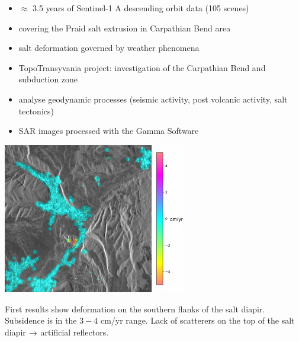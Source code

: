 \documentclass{beamer}
\begin{document}
\begin{frame}{\ft}
    \begin{itemize}
        \item $\approx$ 3.5 years of Sentinel-1 A descending orbit data (105 scenes)
        \item covering the Praid salt extrusion in Carpathian Bend area
        \item salt deformation governed by weather phenomena
        \item TopoTransyvania project: investigation of the Carpathian Bend and subduction zone
        \item analyse geodynamic processes (seismic activity, post volcanic activity, salt tectonics)
        \item SAR images processed with the Gamma Software \cite{werner2000gamma}
    \end{itemize}
\end{frame}


\begin{frame}{\ft}
    \begin{center}
        \includegraphics[width=0.6\textwidth]{parajd.png}
    \end{center}
    
    First results show deformation on the southern flanks of the salt diapir. Subsidence is in the $3-4$ cm/yr range. Lack of scatterers on the top of the salt diapir $\rightarrow$ artificial reflectors.
\end{frame}
\end{document}
